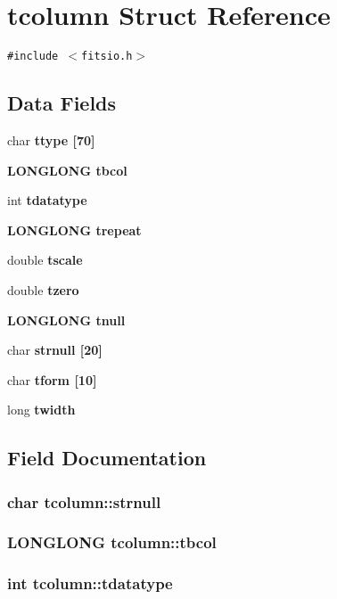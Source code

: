 \section{tcolumn Struct Reference}
\label{structtcolumn}
{\tt \#include $<$fitsio.h$>$}

\subsection*{Data Fields}
\begin{CompactItemize}
\item 
char \bf{ttype} [70]
\item 
\bf{LONGLONG} \bf{tbcol}
\item 
int \bf{tdatatype}
\item 
\bf{LONGLONG} \bf{trepeat}
\item 
double \bf{tscale}
\item 
double \bf{tzero}
\item 
\bf{LONGLONG} \bf{tnull}
\item 
char \bf{strnull} [20]
\item 
char \bf{tform} [10]
\item 
long \bf{twidth}
\end{CompactItemize}


\subsection{Field Documentation}
\subsubsection{\setlength{\rightskip}{0pt plus 5cm}char \bf{tcolumn::strnull}}\label{structtcolumn_e045d30ff2a3199442c69c5f796a8f90}


\subsubsection{\setlength{\rightskip}{0pt plus 5cm}\bf{LONGLONG} \bf{tcolumn::tbcol}}\label{structtcolumn_91d09423f2adfe0270d77085ea065350}


\subsubsection{\setlength{\rightskip}{0pt plus 5cm}int \bf{tcolumn::tdatatype}}\label{structtcolumn_f3abf7e51680994983701dc142182c4d}


